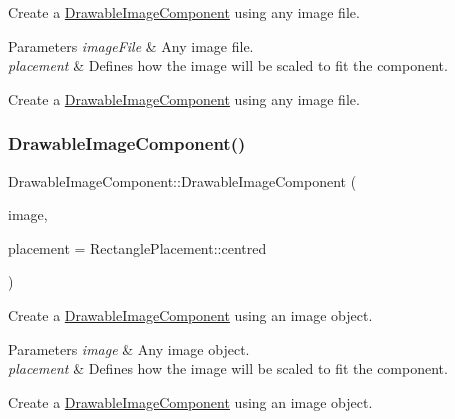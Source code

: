 Create a \mbox{\hyperlink{classDrawableImageComponent}{Drawable\+Image\+Component}} using any image file.


\begin{DoxyParams}{Parameters}
{\em image\+File} & Any image file.\\
\hline
{\em placement} & Defines how the image will be scaled to fit the component.\\
\hline
\end{DoxyParams}
Create a \mbox{\hyperlink{classDrawableImageComponent}{Drawable\+Image\+Component}} using any image file. \mbox{\label{classDrawableImageComponent_aeed2f498ba4b0445711c3645c6af0b4e}} 
\subsubsection{\texorpdfstring{Drawable\+Image\+Component()}{DrawableImageComponent()}\hspace{0.1cm}{\footnotesize\ttfamily [3/5]}}
{\footnotesize\ttfamily Drawable\+Image\+Component\+::\+Drawable\+Image\+Component (\begin{DoxyParamCaption}\item[{Image}]{image,  }\item[{Rectangle\+Placement}]{placement = {\ttfamily RectanglePlacement\+:\+:centred} }\end{DoxyParamCaption})}

Create a \mbox{\hyperlink{classDrawableImageComponent}{Drawable\+Image\+Component}} using an image object.


\begin{DoxyParams}{Parameters}
{\em image} & Any image object.\\
\hline
{\em placement} & Defines how the image will be scaled to fit the component.\\
\hline
\end{DoxyParams}
Create a \mbox{\hyperlink{classDrawableImageComponent}{Drawable\+Image\+Component}} using an image object. \mbox{\label{classDrawableImageComponent_a13f0c4653894511eba10d0760acae76b}} 
